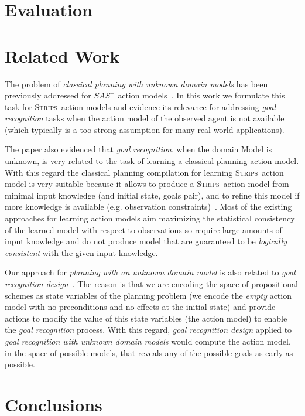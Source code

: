 \documentclass{article}
\newcommand{\strips}{\textsc{Strips}}
\begin{document}
\section{Evaluation}
\label{sec:evaluation}

\section{Related Work}
\label{sec:evaluation}
The problem of {\em classical planning with unknown domain models} has been previously addressed for $SAS^+$ action models~\cite{SternJ17}. In this work we formulate this task for \strips\ action models and evidence its relevance for addressing {\em goal recognition} tasks when the action model of the observed agent is not available (which typically is a too strong  assumption for many real-world applications).   

The paper also evidenced that {\em goal recognition}, when the domain Model is unknown, is very related to the task of learning a classical planning action model. With this regard the classical planning compilation for learning \strips\ action model is very suitable because it allows to produce a \strips\ action model from minimal input knowledge (and initial state, goals pair), and to refine this model if more knowledge is available (e.g. observation constraints)~\cite{aineto2018learning}. Most of the existing approaches for learning action models aim maximizing the statistical consistency of the learned model with respect to observations so require large amounts of input knowledge and do not produce model that are guaranteed to be {\em logically consistent} with the given input knowledge.

Our approach for {\em planning with an unknown domain model} is also related to {\em goal recognition design}~\cite{KerenGK14}. The reason is that we are encoding the space of propositional schemes as state variables of the planning problem (we encode the {\em empty} action model with no preconditions and no effects at the initial state) and provide actions to modify the value of this state variables (the action model) to enable the {\em goal recognition} process. With this regard, {\em goal recognition design} applied to {\em goal recognition with unknown domain models} would compute the action model, in the space of possible models, that reveals any of the possible goals as early as possible.


\section{Conclusions}
\label{sec:conclusions}




\end{document}
